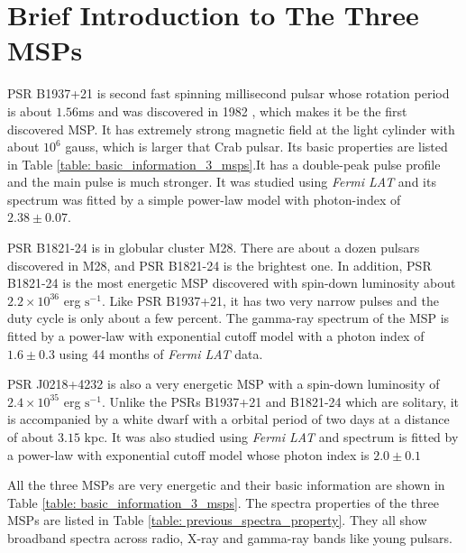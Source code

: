 \documentclass[12pt]{report}
\begin{document}
  \section{Brief Introduction to The Three MSPs}
    PSR B1937+21 is second fast spinning millisecond pulsar whose rotation period 
    is about $1.56$ms and was discovered in 1982 
    \citep{1982Natur.300..615B}, which makes it be the first discovered MSP. It has 
    extremely strong magnetic field at the light cylinder with about $10^6$ gauss, which 
    is larger that Crab pulsar. Its basic 
    properties are listed in Table \ref{table: basic_information_3_msps}.It has a 
    double-peak pulse profile and the main pulse is much stronger.\citep{j1939_pulse_profile} 
    It was studied using \textit{Fermi LAT} and its 
    spectrum was fitted by a simple power-law model with photon-index of $2.38\pm0.07$.
    \citep{0004-637X-787-2-167}
    
    PSR B1821-24 is in globular cluster M28. There 
    are about a dozen pulsars discovered in M28, and PSR B1821-24 is the brightest one. 
    In addition, PSR B1821-24 is the most energetic MSP discovered with spin-down
    luminosity about $2.2\times 10^{36}$ erg $\mbox{s}^{-1}$. Like PSR B1937+21, it has two very 
    narrow pulses and the duty cycle is only about a few percent. 
    \citep{1538-4357-627-2-L125} The gamma-ray spectrum of the MSP is fitted by a 
    power-law with exponential cutoff model with a photon index of $1.6\pm0.3$ using 44 
    months of \textit{Fermi LAT} data. \citep{2013ApJ...778..106J}
    
    PSR J0218+4232 is also a very energetic MSP with a spin-down luminosity of $2.4\times
    10^{35}$ erg $\mbox{s}^{-1}$. Unlike the PSRs B1937+21 and B1821-24 which are solitary,
    it is accompanied by a white dwarf with a orbital period of two days at a distance of 
    about $3.15$ kpc. \citep{article}
    It was also studied using \textit{Fermi LAT} and spectrum is fitted 
    by a power-law with exponential cutoff model whose photon index is $2.0\pm0.1$ 
    \citep{0067-0049-208-2-17}

    All the three MSPs are very energetic and their basic information are shown in Table 
    \ref{table: basic_information_3_msps}. The spectra properties of the three MSPs are 
    listed in Table \ref{table: previous_spectra_property}. They all show broadband 
    spectra across radio, X-ray and gamma-ray bands like young pulsars. 
\end{document}
